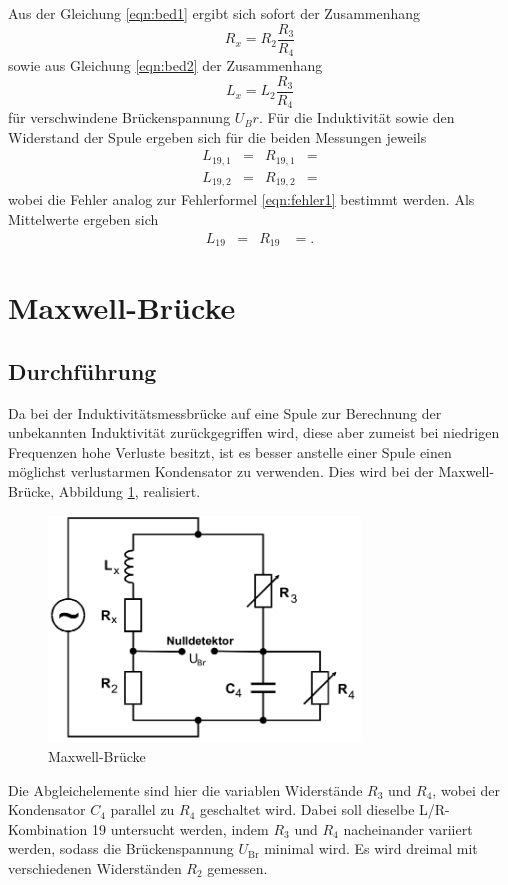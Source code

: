 Aus der Gleichung \ref{eqn:bed1} ergibt sich sofort der Zusammenhang
\begin{equation}
  R_x = R_2 \frac{R_3}{R_4}
\end{equation}
sowie aus Gleichung \ref{eqn:bed2} der Zusammenhang
\begin{equation}
  L_x = L_2 \frac{R_3}{R_4}
\end{equation}
für verschwindene Brückenspannung $U_Br$.
Für die Induktivität sowie den Widerstand der Spule ergeben sich für die beiden Messungen jeweils
\begin{align*}
  L_{19,1}   &=  & R_{19,1} &= \\
  L_{19,2}   &=  & R_{19,2} &= 
\end{align*}
wobei die Fehler analog zur Fehlerformel \ref{eqn:fehler1} bestimmt werden.
Als Mittelwerte ergeben sich
\begin{align*}
  L_{19}   &=  & R_{19} &= .
\end{align*}

\section{Maxwell-Brücke}
\subsection{Durchführung}
Da bei der Induktivitätsmessbrücke auf eine Spule zur Berechnung der unbekannten Induktivität zurückgegriffen wird, diese aber zumeist bei niedrigen Frequenzen hohe Verluste besitzt, ist es besser anstelle einer Spule einen möglichst verlustarmen Kondensator zu verwenden.
Dies wird bei der Maxwell-Brücke, Abbildung \ref{fig:4}, realisiert.
\begin{figure}[H]
  \centering
  \includegraphics[height=6cm]{max.png}
  \caption{Maxwell-Brücke \cite{sample}}
  \label{fig:4}
\end{figure}
Die Abgleichelemente sind hier die variablen Widerstände $R_3$ und $R_4$, wobei der Kondensator $C_4$ parallel zu $R_4$ geschaltet wird.
Dabei soll dieselbe L/R-Kombination 19 untersucht werden, indem $R_3$ und $R_4$ nacheinander variiert werden, sodass die Brückenspannung $U_{\text{Br}}$ minimal wird.
Es wird dreimal mit verschiedenen Widerständen $R_2$ gemessen.
